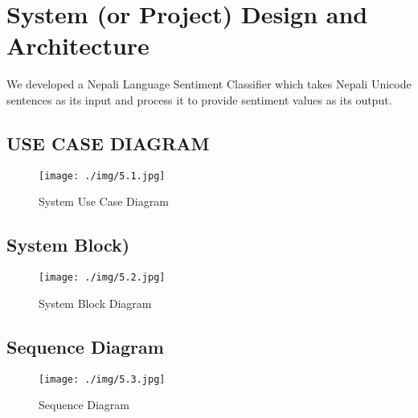	\chapter{System (or Project) Design and Architecture}
	    We developed a Nepali Language Sentiment Classifier which takes Nepali Unicode
sentences as its input and process it to provide sentiment values as its output.
        \section{USE CASE DIAGRAM}
          \begin{figure}[h]
		    \centering
		      \texttt{[image: ./img/5.1.jpg]}
			    \caption{System Use Case Diagram}
		\end{figure}
        \section{System Block)}
        	\begin{figure}[h]
		    \centering
			    \texttt{[image: ./img/5.2.jpg]}
			    \caption{System Block Diagram}
		\end{figure}
        
        \section{Sequence Diagram}
        \begin{figure}[h]
		    \centering
			    \texttt{[image: ./img/5.3.jpg]}
			    \caption{Sequence Diagram}
		\end{figure}